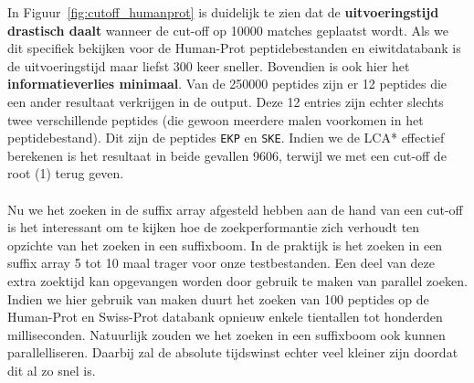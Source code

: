 In Figuur~\ref{fig:cutoff_humanprot} is duidelijk te zien dat de \textbf{uitvoeringstijd drastisch daalt} wanneer de cut-off op 10000 matches geplaatst wordt.
Als we dit specifiek bekijken voor de Human-Prot peptidebestanden en eiwitdatabank is de uitvoeringstijd maar liefst 300 keer sneller.
Bovendien is ook hier het \textbf{informatieverlies minimaal}.
Van de 250000 peptides zijn er 12 peptides die een ander resultaat verkrijgen in de output.
Deze 12 entries zijn echter slechts twee verschillende peptides (die gewoon meerdere malen voorkomen in het peptidebestand).
Dit zijn de peptides \texttt{EKP} en \texttt{SKE}.
Indien we de LCA* effectief berekenen is het resultaat in beide gevallen 9606, terwijl we met een cut-off de root (1) terug geven.
\\ \\
Nu we het zoeken in de suffix array afgesteld hebben aan de hand van een cut-off is het interessant om te kijken hoe de zoekperformantie zich verhoudt ten opzichte van het zoeken in een suffixboom.
In de praktijk is het zoeken in een suffix array 5 tot 10 maal trager voor onze testbestanden.
Een deel van deze extra zoektijd kan opgevangen worden door gebruik te maken van parallel zoeken.
Indien we hier gebruik van maken duurt het zoeken van 100 peptides op de Human-Prot en Swiss-Prot databank opnieuw enkele tientallen tot honderden milliseconden.
Natuurlijk zouden we het zoeken in een suffixboom ook kunnen parallelliseren.
Daarbij zal de absolute tijdswinst echter veel kleiner zijn doordat dit al zo snel is.

